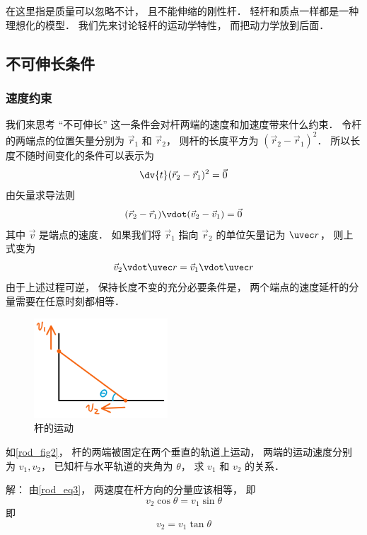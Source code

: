 

在这里指是质量可以忽略不计， 且不能伸缩的刚性杆． 轻杆和质点一样都是一种理想化的模型． 我们先来讨论轻杆的运动学特性， 而把动力学放到后面．

\subsection{不可伸长条件}
\subsubsection{速度约束}
我们来思考 “不可伸长” 这一条件会对杆两端的速度和加速度带来什么约束． 令杆的两端点的位置矢量分别为 $\vec r_1$ 和 $\vec r_2$， 则杆的长度平方为 $(\vec r_2 - \vec r_1)^2$． 所以长度不随时间变化的条件可以表示为
\begin{equation}\label{rod_eq2}
\dv{t} (\vec r_2 - \vec r_1)^2 = \vec 0
\end{equation}
由矢量求导法则
\begin{equation}\label{rod_eq1}
(\vec r_2 - \vec r_1) \vdot (\vec v_2 - \vec v_1) = \vec 0
\end{equation}
其中 $\vec v$ 是端点的速度． 如果我们将 $\vec r_1$ 指向 $\vec r_2$ 的单位矢量记为 $\uvec r$， 则上式变为
\begin{equation}\label{rod_eq3}
\vec v_2 \vdot \uvec r = \vec v_1 \vdot \uvec r
\end{equation}
由于上述过程可逆， 保持长度不变的充分必要条件是， 两个端点的速度延杆的分量需要在任意时刻都相等．

\begin{exam}{}\label{rod_ex1}
\begin{figure}[ht]
\centering
\includegraphics[width=5cm]{./figures/rod1.png}
\caption{杆的运动} \label{rod_fig1}
\end{figure}
如\autoref{rod_fig2}， 杆的两端被固定在两个垂直的轨道上运动， 两端的运动速度分别为 $v_1, v_2$， 已知杆与水平轨道的夹角为 $\theta$， 求 $v_1$ 和 $v_2$ 的关系．

解： 由\autoref{rod_eq3}， 两速度在杆方向的分量应该相等， 即
\begin{equation}
v_2 \cos\theta = v_1 \sin\theta
\end{equation}
即
\begin{equation}
v_2 = v_1 \tan\theta
\end{equation}
\end{exam}

